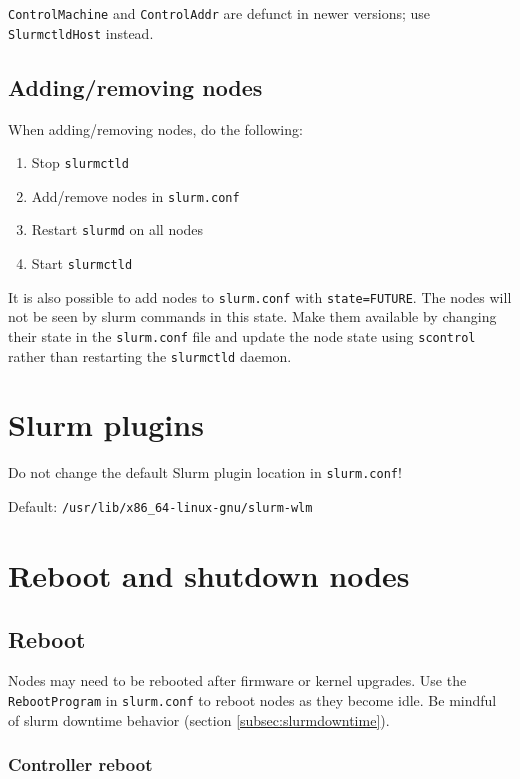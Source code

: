 \texttt{ControlMachine} and \texttt{ControlAddr} are defunct in newer versions; use \texttt{SlurmctldHost} instead.

\subsection{Adding/removing nodes} \label{subsec:addnodes}

When adding/removing nodes, do the following:
\begin{enumerate}
  \item Stop \texttt{slurmctld}
  \item Add/remove nodes in \texttt{slurm.conf}
  \item Restart \texttt{slurmd} on all nodes
  \item Start \texttt{slurmctld}
\end{enumerate}

\noindent It is also possible to add nodes to \texttt{slurm.conf} with \texttt{state=FUTURE}. The nodes will not be seen by slurm commands in this state. Make them available by changing their state in the \texttt{slurm.conf} file and update the node state using \texttt{scontrol} rather than restarting the \texttt{slurmctld} daemon.

\section{Slurm plugins} \label{sec:slurmplugins}

Do not change the default Slurm plugin location in \texttt{slurm.conf}!

Default: \texttt{/usr/lib/x86\_64-linux-gnu/slurm-wlm}

\section{Reboot and shutdown nodes} \label{sec:slurmpowercycle}

\subsection{Reboot} \label{subsec:slurmreboot}

Nodes may need to be rebooted after firmware or kernel upgrades. Use the \texttt{RebootProgram} in \texttt{slurm.conf} to reboot nodes as they become idle. Be mindful of slurm downtime behavior (section \ref{subsec:slurmdowntime}).

\subsubsection{Controller reboot} \label{subsec:rebootSlurmControl}

